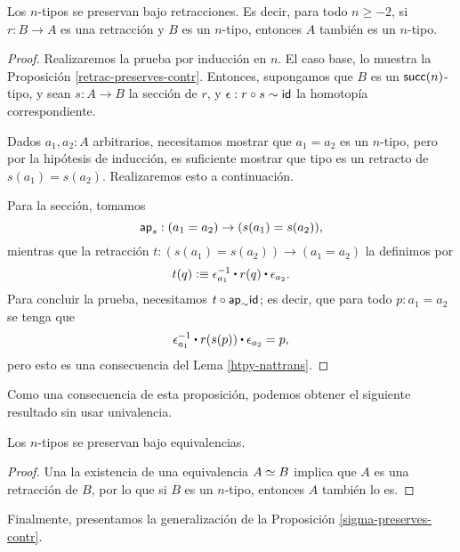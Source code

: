 \documentclass[../main.tex]{subfiles}
\begin{document}
\begin{proposition}
  Los $n$-tipos se preservan bajo retracciones. Es decir, para todo $n \geq -2$, si $r:B \to A$ es una retracci\'on y $B$ es un $n$-tipo, entonces $A$ tambi\'en es un $n$-tipo.
\end{proposition}
\begin{proof}
  Realizaremos la prueba por inducción en $n$.
  El caso base, lo muestra la Proposici\'on \ref{retrac-preserves-contr}.
  Entonces, supongamos que $B$ es un $\mathsf{succ}(n)$-tipo, y sean $s:A \to B$ la secci\'on de $r$, y $\epsilon : r \circ s \sim \mathsf{id}_{}$ la homotop\'ia correspondiente.

  Dados $a_1, a_2 :A$ arbitrarios, necesitamos mostrar que $a_1=a_2$ es un $n$-tipo,
  pero por la hip\'otesis de inducci\'on, es suficiente mostrar que tipo es un retracto de $s(a_1)=s(a_2)$. Realizaremos esto a continuaci\'on.

  Para la secci\'on, tomamos
  \[ \mathsf{ap}_{s} : (a_1 = a_2) \to (s(a_1) = s(a_2)), \]
  mientras que la retracci\'on $t: (s(a_1) = s(a_2)) \to (a_1 = a_2)$ la definimos por
  \[ t(q) \defeq \epsilon_{a_1}^{-1} \ct r(q) \ct \epsilon_{a_2}. \]
  Para concluir la prueba, necesitamos $t \circ \mathsf{ap}_{\sim} \mathsf{id}_{}$; es decir, que para todo $p:a_1 = a_2$ se tenga que
  \[ \epsilon_{a_1}^{-1} \ct r(s(p)) \ct \epsilon_{a_2} = p, \]
  pero esto es una consecuencia del Lema \ref{htpy-nattrans}.
\end{proof}

Como una consecuencia de esta proposici\'on, podemos obtener el siguiente resultado sin usar univalencia.
\begin{corollary}\label{eq-preserves-ntypes}
  Los $n$-tipos se preservan bajo equivalencias.
\end{corollary}
\begin{proof}
  Una la existencia de una equivalencia $A \simeq B$ implica que $A$ es una retracci\'on de $B$, por lo que si $B$ es un $n$-tipo, entonces $A$ tambi\'en lo es.
\end{proof}

Finalmente, presentamos la generalizaci\'on de la Proposici\'on \ref{sigma-preserves-contr}.
\end{document}
